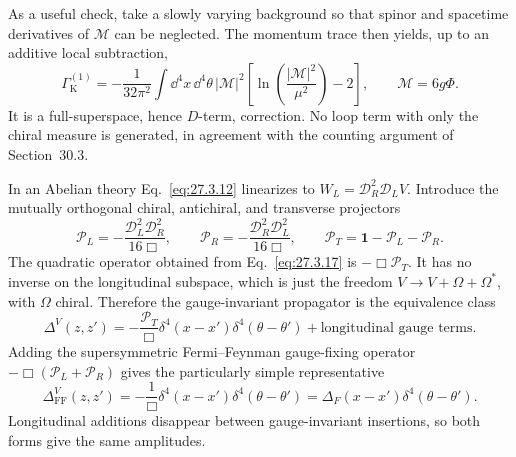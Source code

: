 \begin{enumerate}
  As a useful check, take a slowly varying background so that spinor and
  spacetime derivatives of \(\mathcal M\) can be neglected.  The momentum
  trace then yields, up to an additive local subtraction,
  \[
    \Gamma_{\mathrm{K}}^{(1)}
      =-\frac{1}{32\pi^2}
       \int \dd^4x\,\dd^4\theta\,
       |\mathcal M|^2
       \left[
         \ln\!\left(\frac{|\mathcal M|^2}{\mu^2}\right)-2
       \right],
    \qquad \mathcal M=6g\Phi .
  \]
  It is a full-superspace, hence \(D\)-term, correction.  No loop term
  with only the chiral measure is generated, in agreement with the
  counting argument of Section~30.3.

  In an Abelian theory Eq.~\eqref{eq:27.3.12} linearizes to
  \(W_L=\mathcal D_R^2\mathcal D_LV\).  Introduce the mutually orthogonal
  chiral, antichiral, and transverse projectors
  \[
    \mathcal P_L=-\frac{\mathcal D_L^2\mathcal D_R^2}{16\Box},
    \qquad
    \mathcal P_R=-\frac{\mathcal D_R^2\mathcal D_L^2}{16\Box},
    \qquad
    \mathcal P_T=\mathbf{1}-\mathcal P_L-\mathcal P_R .
  \]
  The quadratic operator obtained from Eq.~\eqref{eq:27.3.17} is
  \(-\Box\mathcal P_T\).  It has no inverse on the longitudinal
  subspace, which is just the freedom
  \(V\to V+\Omega+\Omega^*\), with \(\Omega\) chiral.  Therefore the
  gauge-invariant propagator is the equivalence class
  \[
    \Delta^V(z,z')
      =-\frac{\mathcal P_T}{\Box}
       \delta^4(x-x')\delta^4(\theta-\theta')
       +\text{longitudinal gauge terms}.
  \]
  Adding the supersymmetric Fermi--Feynman gauge-fixing operator
  \(-\Box(\mathcal P_L+\mathcal P_R)\) gives the particularly simple
  representative
  \[
    \Delta^V_{\mathrm{FF}}(z,z')
      =-\frac1{\Box}\delta^4(x-x')\delta^4(\theta-\theta')
      =\Delta_F(x-x')\delta^4(\theta-\theta').
  \]
  Longitudinal additions disappear between gauge-invariant insertions, so
  both forms give the same amplitudes.
\end{enumerate}
